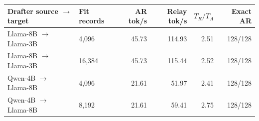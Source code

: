 \begin{tabular}{llrrrr}
\toprule
Drafter source $\rightarrow$ target & Fit records & AR tok/s & Relay tok/s & $T_R/T_A$ & Exact AR \\
\midrule
Llama-8B $\rightarrow$ Llama-3B & 4,096 & 45.73 & 114.93 & 2.51 & 128/128 \\
Llama-8B $\rightarrow$ Llama-3B & 16,384 & 45.73 & 115.44 & 2.52 & 128/128 \\
Qwen-4B $\rightarrow$ Llama-8B & 4,096 & 21.61 & 51.97 & 2.41 & 128/128 \\
Qwen-4B $\rightarrow$ Llama-8B & 8,192 & 21.61 & 59.41 & 2.75 & 128/128 \\
\bottomrule
\end{tabular}
